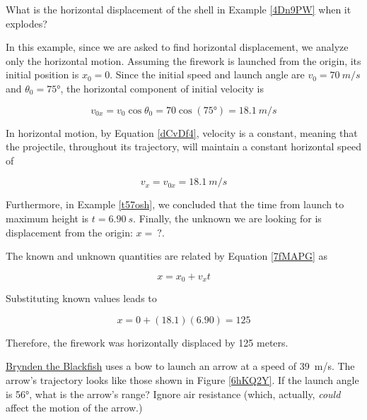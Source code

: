 \documentclass{article}
\begin{document}
\begin{example} 
    What is the horizontal displacement of the shell in Example \ref{4Dn9PW} when it explodes?
\end{example}

\Solution In this example, since we are asked to find horizontal displacement, we analyze only the horizontal motion. Assuming the firework is launched from the origin, its initial position is $x_0 = 0$. Since the initial speed and launch angle are $v_0 = \SI{70}{m/s}$ and $\theta_0 = \ang{75}$,  the horizontal component of initial velocity is

\begin{equation*}
    v_{0x} = v_0 \cos{\theta_0} = 70 \cos{(\ang{75})} = \SI{18.1}{m/s}
\end{equation*}

In horizontal motion, by Equation \eqref{dCvDf4}, velocity is a constant, meaning that the projectile, throughout its trajectory, will maintain a constant horizontal speed of 

\begin{equation*}
    v_x = v_{0x} = \SI{18.1}{m/s}
\end{equation*}


Furthermore, in Example \ref{t57osh}, we concluded that the time from launch to maximum height is $t = \SI{6.90}{s}$. Finally, the unknown we are looking for is displacement from the origin: $x =\ ?$.

\vspace{1em}

The known and unknown quantities are related by Equation \eqref{7fMAPG} as

\begin{equation*}
    x = x_0 + v_x t
\end{equation*}

Substituting known values leads to 

\begin{equation*}
    x = 0 + (18.1)(6.90) = 125 
\end{equation*}

Therefore, the firework was horizontally displaced by 125 meters.

\endsolution

\begin{example}
    \href{https://youtu.be/9Ijev8RHF04}{Brynden the Blackfish} uses a bow to launch an arrow at a speed of \SI{39}{m/s}. The arrow's trajectory looks like those shown in Figure \ref{6hKQ2Y}. If the launch angle is \ang{56}, what is the arrow's range? Ignore air resistance (which, actually, \textit{could} affect the motion of the arrow.) 
\end{example}
\end{document}
